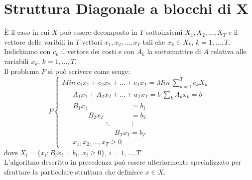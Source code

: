 \section{Struttura Diagonale a blocchi di X}
È il caso in cui $X$ può essere decomposto in $T$ sottoinsiemi $X_{1},X_{2},\dots,X_{T}$ e il vettore delle varibili in $T$ vettori $x_{1},x_{2},\dots,x_{T}$ tali che $x_{k}\in X_{k}$, $k=1,\dots,T$.\\
Indichiamo con $c_{k}$ il vettore dei costi e con $A_{k}$ la sottomatrice di $A$ relativa alle variabili $x_{k}$, $k=1,\dots,T$.\\
Il problema $P$ si può scrivere come seuge:
\begin{equation*}
	P
	\begin{cases}
	Min\ c_{1}x_{1}+c_{2}x_{2}+\dots+c_{T}x_{T}=Min\ \sum_{k=1}^{T}c_{k}X_{k} \\
	\ \ \ \ \ \ \ A_{1}x_{1}+A_{2}x_{2}+\dots+a_{T}x_{T}=b\ \sum_{k}A_{k}x_{k}=b \\
	\ \ \ \ \ \ \ B_{1}x_{1}\ \ \ \ \ \ \ \ \ \ \ \ \ \ \ \ \ \ \ \ \ \ \ \ \ \ \ \ =b_{1} \\
	\ \ \ \ \ \ \ \ \ \ \ \ \ \ \ \ \ B_{2}x_{2}\ \ \ \ \ \ \ \ \ \ \ \ \ \ \ \ \ \ =b_{2} \\
	\ \ \ \ \ \ \ \ \ \ \ \ \ \ \ \ \ \ \ \ \ \ \ \ \ \ \ \ddots\ \ \ \ \ \ \ \ \ \ \ \ \ \vdots \\
	\ \ \ \ \ \ \ \ \ \ \ \ \ \ \ \ \ \ \ \ \ \ \ \ \ \ \ \ \ \ \ \ \ \ B_{T}x_{T}=b_{T}\\
	\ \ \ \ \ \ \ x_{1},x_{2},\dots,x_{T}\ge 0
	\end{cases}
\end{equation*}
dove $X_{i}=\{x_{i}:B_{i}x_{i}=b_{i},\ x_{i}\ge 0\}$, $i=1,\dots,T$.\\
L'algoritmo descritto in precedenza può essere ulteriormente specializzato per sfruttare la particolare struttura che definisce $x\in X$.

